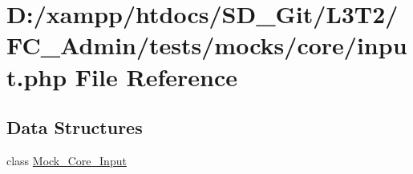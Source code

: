 \hypertarget{_admin_2tests_2mocks_2core_2_input_8php}{}\section{D\+:/xampp/htdocs/\+S\+D\+\_\+\+Git/\+L3\+T2/\+F\+C\+\_\+\+Admin/tests/mocks/core/input.php File Reference}
\label{_admin_2tests_2mocks_2core_2_input_8php}
\subsection*{Data Structures}
\begin{DoxyCompactItemize}
\item 
class \hyperlink{class_mock___core___input}{Mock\+\_\+\+Core\+\_\+\+Input}
\end{DoxyCompactItemize}
